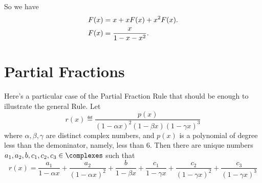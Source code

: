 \documentclass[quiz]{mcs}
\begin{document}
So we have
\begin{align}
F(x) & = x + x F(x) + x^2 F(x). \notag\\
F(x) & = \frac{x}{1 - x - x^2}.\label{Fx}
\end{align}

\section{Partial Fractions}

Here's a particular case of the Partial Fraction Rule that should be
enough to illustrate the general Rule.  Let
\[
r(x) \eqdef \frac{p(x)}{(1-\alpha x)^2 (1-\beta x) (1-\gamma x)^3}
\]
where $\alpha, \beta, \gamma$ are distinct complex numbers, and $p(x)$ is
a polynomial of degree less than the demoninator, namely, less than 6.
Then there are unique numbers $a_1,a_2,b,c_1,c_2,c_3 \in \complexes$ such
that
\[
r(x)
= \frac{a_1}{1-\alpha x} + \frac{a_2}{(1-\alpha x)^2}
+ \frac{b}{1-\beta x}
+ \frac{c_1}{1-\gamma x} + \frac{c_2}{(1-\gamma x)^2} + \frac{c_3}{(1-\gamma x)^3}
\]


\end{document}
